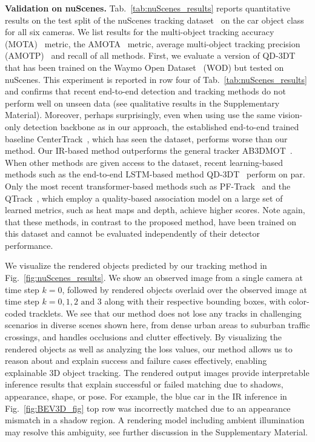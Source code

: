 \vspace{0.5\baselineskip}
\noindent
\textbf{Validation on nuScenes.} Tab.~\ref{tab:nuScenes_results} reports quantitative results on the test split of the nuScenes tracking dataset~\cite{caesar2020nuscenes} on the car object class for all six cameras. We list results for the multi-object tracking accuracy (MOTA)~\cite{bernardin2006MOTA} metric, the AMOTA~\cite{weng2020AB3DMOT} metric, average multi-object tracking precision (AMOTP)~\cite{weng2020AB3DMOT} and recall of all methods. First, we evaluate a version of QD-3DT~\cite{hu2021QD3DT} that has been trained on the Waymo Open Dataset~\cite{sun2020scalability} (WOD) but tested on nuScenes. This experiment is reported in row four of Tab.~\ref{tab:nuScenes_results} and confirms that recent end-to-end detection and tracking methods do not perform well on unseen data (see qualitative results in the Supplementary Material). Moreover, perhaps surprisingly, even when using use the same vision-only detection backbone as in our approach, the established end-to-end trained baseline CenterTrack~\cite{zhou2020CenterTrack}, which has seen the dataset, performs worse than our method.
Our IR-based method outperforms the general tracker AB3DMOT~\cite{weng2020AB3DMOT}. %
When other methods are given access to the dataset, recent learning-based methods such as the end-to-end LSTM-based method QD-3DT~\cite{hu2021QD3DT} perform on par.  Only the most recent transformer-based methods such as PF-Track~\cite{pang2023PFtrack} and the QTrack~\cite{yang2022qtrack}, which employ a quality-based association model on a large set of learned metrics, such as heat maps and depth, achieve higher scores. Note again, that these methods, in contrast to the proposed method, have been trained on this dataset and cannot be evaluated independently of their detector performance.

We visualize the rendered objects predicted by our tracking method in Fig.~\ref{fig:nuScenes_results}. We show an observed image from a single camera at time step $k = 0$, followed by rendered objects overlaid over the observed image at time step $k = 0, 1, 2 \text{ and } 3$ along with their respective bounding boxes, with color-coded tracklets. We see that our method does not lose any tracks in challenging scenarios in diverse scenes shown here, from dense urban areas to suburban traffic crossings, and handles occlusions and clutter effectively. By visualizing the rendered objects as well as analyzing the loss values, our method allows us to reason about and explain success and failure cases effectively, enabling explainable 3D object tracking. The rendered output images provide interpretable inference results that explain successful or failed matching due to shadows, appearance, shape, or pose. For example, the blue car in the IR inference in Fig.~\ref{fig:BEV3D_fig} top row was incorrectly matched due to an appearance mismatch in a shadow region. A rendering model including ambient illumination may resolve this ambiguity, see further discussion in the Supplementary Material.

